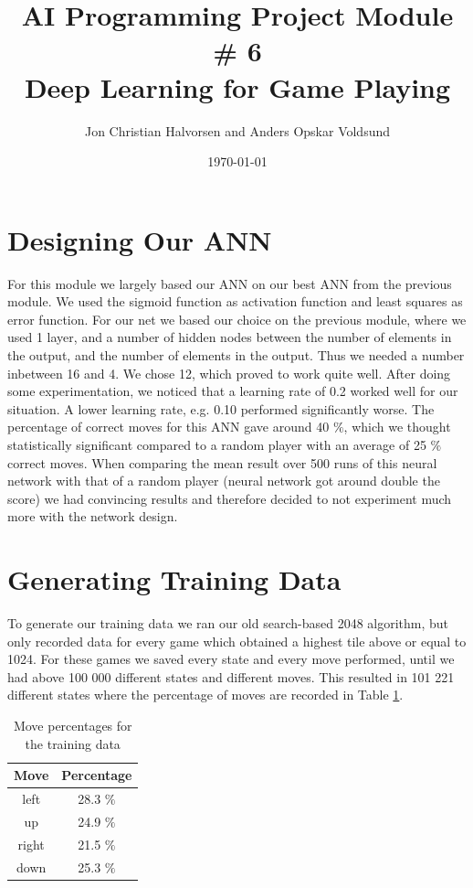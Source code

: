\documentclass[11pt,a4paper]{article}
\author{Jon Christian Halvorsen and Anders Opskar Voldsund}
\title{ \textbf{ AI Programming Project Module \# 6 }  \\
Deep Learning for Game Playing }
\date{\today}
\begin{document}
\maketitle

\section*{Designing Our ANN}
For this module we largely based our ANN on our best ANN from the previous module. We used the sigmoid function as activation function and least squares as error function. For our net we based our choice on the previous module, where we used 1 layer, and a number of hidden nodes between the number of elements in the output, and the number of elements in the output. Thus we needed a number inbetween 16 and 4. We chose 12, which proved to work quite well. After doing some experimentation, we noticed that a learning rate of 0.2 worked well for our situation. A lower learning rate, e.g. 0.10 performed significantly worse. The percentage of correct moves for this ANN gave around 40 $\%$, which we thought statistically significant compared to a random player with an average of 25 $\%$ correct moves. When comparing the mean result over 500 runs of this neural network with that of a random player (neural network got around double the score) we had convincing results and therefore decided to not experiment much more with the network design.

\section*{Generating Training Data}
To generate our training data we ran our old search-based 2048 algorithm, but only recorded data for every game which obtained a highest tile above or equal to 1024. For these games we saved every state and every move performed, until we had above 100 000 different states and different moves. This resulted in 101 221 different states where the percentage of moves are recorded in Table \ref{tab:percentage}.

\begin{table}[h!]
\centering
\caption{Move percentages for the training data}
\begin{tabular}{cc}
Move & Percentage \\
\hline
left & 28.3 $\%$ \\
up & 24.9 $\%$ \\
right & 21.5 $\%$ \\
down & 25.3 $\%$
\end{tabular}
\label{tab:percentage}
\end{table}
\end{document}
